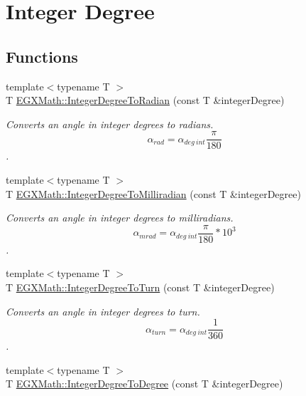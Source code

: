 \hypertarget{group___e_g_x_math-_angle_conversions-_integer_degree}{}\section{Integer Degree}
\label{group___e_g_x_math-_angle_conversions-_integer_degree}
\subsection*{Functions}
\begin{DoxyCompactItemize}
\item 
{\footnotesize template$<$typename T $>$ }\\T \mbox{\hyperlink{group___e_g_x_math-_angle_conversions-_integer_degree_ga05d3368b00ea27b9895de2ffe5c8df38}{E\+G\+X\+Math\+::\+Integer\+Degree\+To\+Radian}} (const T \&integer\+Degree)
\begin{DoxyCompactList}\small\item\em Converts an angle in integer degrees to radians. \[\alpha_{rad}=\alpha_{deg\ int}\frac{\pi}{180}\]. \end{DoxyCompactList}\item 
{\footnotesize template$<$typename T $>$ }\\T \mbox{\hyperlink{group___e_g_x_math-_angle_conversions-_integer_degree_ga5379a68bdff5cc4fab5bb1ba06ef9453}{E\+G\+X\+Math\+::\+Integer\+Degree\+To\+Milliradian}} (const T \&integer\+Degree)
\begin{DoxyCompactList}\small\item\em Converts an angle in integer degrees to milliradians. \[\alpha_{mrad}=\alpha_{deg\ int}\frac{\pi}{180}*10^3\]. \end{DoxyCompactList}\item 
{\footnotesize template$<$typename T $>$ }\\T \mbox{\hyperlink{group___e_g_x_math-_angle_conversions-_integer_degree_ga06ddbdada5a3978105c855d4aae735ae}{E\+G\+X\+Math\+::\+Integer\+Degree\+To\+Turn}} (const T \&integer\+Degree)
\begin{DoxyCompactList}\small\item\em Converts an angle in integer degrees to turn. \[\alpha_{turn}=\alpha_{deg\ int}\frac{1}{360}\]. \end{DoxyCompactList}\item 
{\footnotesize template$<$typename T $>$ }\\T \mbox{\hyperlink{group___e_g_x_math-_angle_conversions-_integer_degree_gaa9b63c6095fd7f8809fcfa2ba1e62235}{E\+G\+X\+Math\+::\+Integer\+Degree\+To\+Degree}} (const T \&integer\+Degree)

\end{DoxyCompactItemize}
